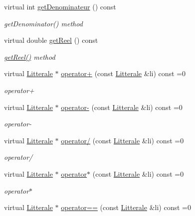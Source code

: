 \begin{DoxyCompactItemize}
virtual int \hyperlink{class_litterale_a68a07beac9e8a4e71d3920a4c6c27cc7}{get\+Denominateur} () const 
\begin{DoxyCompactList}\small\item\em get\+Denominator() method \end{DoxyCompactList}\item 
virtual double \hyperlink{class_litterale_aca56aad5f1a4a691337142e3f5a3b93d}{get\+Reel} () const 
\begin{DoxyCompactList}\small\item\em \hyperlink{class_litterale_aca56aad5f1a4a691337142e3f5a3b93d}{get\+Reel()} method \end{DoxyCompactList}\item 
virtual \hyperlink{class_litterale}{Litterale} $\ast$ \hyperlink{class_litterale_af4f96b09214b34ae26fe3f2722c42cc0}{operator+} (const \hyperlink{class_litterale}{Litterale} \&li) const  =0
\begin{DoxyCompactList}\small\item\em operator+ \end{DoxyCompactList}\item 
virtual \hyperlink{class_litterale}{Litterale} $\ast$ \hyperlink{class_litterale_a52eec71121af9c4bbf30011eccc87a68}{operator-\/} (const \hyperlink{class_litterale}{Litterale} \&li) const  =0
\begin{DoxyCompactList}\small\item\em operator-\/ \end{DoxyCompactList}\item 
virtual \hyperlink{class_litterale}{Litterale} $\ast$ \hyperlink{class_litterale_a91da4f609054b3146007291d199e1f33}{operator/} (const \hyperlink{class_litterale}{Litterale} \&li) const  =0
\begin{DoxyCompactList}\small\item\em operator/ \end{DoxyCompactList}\item 
virtual \hyperlink{class_litterale}{Litterale} $\ast$ \hyperlink{class_litterale_a54eb0d992188da6b490418bdd828b096}{operator$\ast$} (const \hyperlink{class_litterale}{Litterale} \&li) const  =0
\begin{DoxyCompactList}\small\item\em operator$\ast$ \end{DoxyCompactList}\item 
virtual \hyperlink{class_litterale}{Litterale} $\ast$ \hyperlink{class_litterale_a3d4832d994a32a36cb88f8a7d021b280}{operator==} (const \hyperlink{class_litterale}{Litterale} \&li) const  =0

\end{DoxyCompactItemize}
